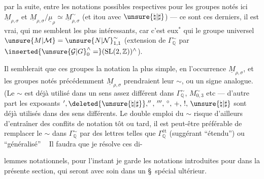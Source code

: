 
par la suite, entre les notations possibles
respectives pour les groupes notés ici
$\underline M_{\rho,\sigma}$ et
$\underline M_{\rho,\sigma}/\underline\mu_\rho\simeq
\underline M_{\rho,\sigma}^{\sim}$
(et itou avec $\unsure{\natural|\sharp}$)
--- ce sont ces derniers, il est vrai, qui me semblent les plus intéressants,
car c'est eux$^{*}$ qui  le groupe universel
$\unsure{M|\mathcal M}=\unsure{N|\mathcal N}_{1,1}^{\sim}$
(extension de $\Gamma_{\mathbb Q}^{\sim}$ par
$\inserted{\unsure{\mathcal G|G}_{0}^{\wedge}=}
(\mathrm{SL}(2,\mathbb Z))^{\wedge}$).

Il semblerait que ces groupes  la notation la plus simple,
en l'occurrence $\underline M_{\rho,\sigma}$, et les groupes notés
précédemment $\underline M_{\rho,\sigma}$ prendraient leur $\sim$,
ou un signe analogue. (Le $\sim$ est déjà utilisé dans un sens assez
différent dans $\Gamma_{\mathbb Q}^{\sim}$,
$M_{0,3}^{\sim}$ etc --- d'autre part les exposants
$',\deleted{\unsure{\natural|\sharp}},'',\,''',\,{}^{\circ},\,+,\,!,\,
\unsure{\natural|\sharp}$
sont déjà utilisés dans des sens différents.
Le double emploi du $\sim$ risque d'ailleurs d'entraîner des conflits de
notation tôt ou tard, il est peut-être préférable de remplacer le $\sim$
dans $\Gamma_{\mathbb Q}^{\sim}$ par des lettres telles que
$\Gamma_{\mathbb Q}^{\text{ét}}$
(suggérant ``étendu'') ou 
``généralisé'' \ 
Il faudra que je résolve ces di-

lemmes notationnels, pour l'instant je garde les notations introduites pour
 dans la présente section, qui seront
 avec soin dans un \S\ spécial ultérieur.

